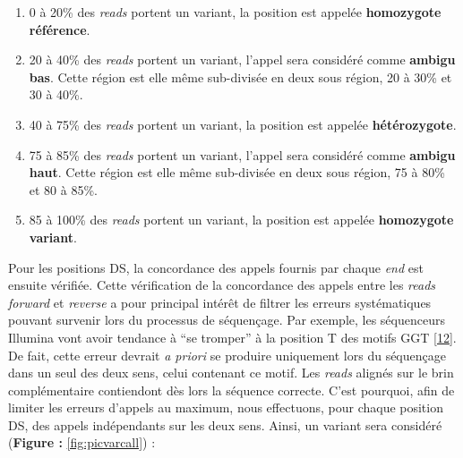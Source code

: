 \documentclass[12pt,twoside]{reedthesis}
\providecommand{\tightlist}{%
  \setlength{\itemsep}{0pt}\setlength{\parskip}{0pt}}
\theoremstyle{definition}
\theoremstyle{definition}
\theoremstyle{remark}
\begin{document}
  \begin{enumerate}
  \def\labelenumi{\arabic{enumi}.}
  \tightlist
  \item
    0 à 20\% des \emph{reads} portent un variant, la position est appelée
    \textbf{homozygote référence}.\\
  \item
    20 à 40\% des \emph{reads} portent un variant, l'appel sera considéré
    comme \textbf{ambigu bas}. Cette région est elle même sub-divisée en
    deux sous région, 20 à 30\% et 30 à 40\%.\\
  \item
    40 à 75\% des \emph{reads} portent un variant, la position est appelée
    \textbf{hétérozygote}.\\
  \item
    75 à 85\% des \emph{reads} portent un variant, l'appel sera considéré
    comme \textbf{ambigu haut}. Cette région est elle même sub-divisée en
    deux sous région, 75 à 80\% et 80 à 85\%.\\
  \item
    85 à 100\% des \emph{reads} portent un variant, la position est
    appelée \textbf{homozygote variant}.
  \end{enumerate}
  
  Pour les positions DS, la concordance des appels fournis par chaque
  \emph{end} est ensuite vérifiée. Cette vérification de la concordance
  des appels entre les \emph{reads forward} et \emph{reverse} a pour
  principal intérêt de filtrer les erreurs systématiques pouvant survenir
  lors du processus de séquençage. Par exemple, les séquenceurs Illumina
  vont avoir tendance à ``se tromper'' à la position T des motifs GGT
  {[}\protect\hyperlink{ref-Robinson2011}{12}{]}. De fait, cette erreur
  devrait \emph{a priori} se produire uniquement lors du séquençage dans
  un seul des deux sens, celui contenant ce motif. Les \emph{reads}
  alignés sur le brin complémentaire contiendont dès lors la séquence
  correcte. C'est pourquoi, afin de limiter les erreurs d'appels au
  maximum, nous effectuons, pour chaque position DS, des appels
  indépendants sur les deux sens. Ainsi, un variant sera considéré
  (\textbf{Figure : }\ref{fig:picvarcall}) :
  
\end{document}
